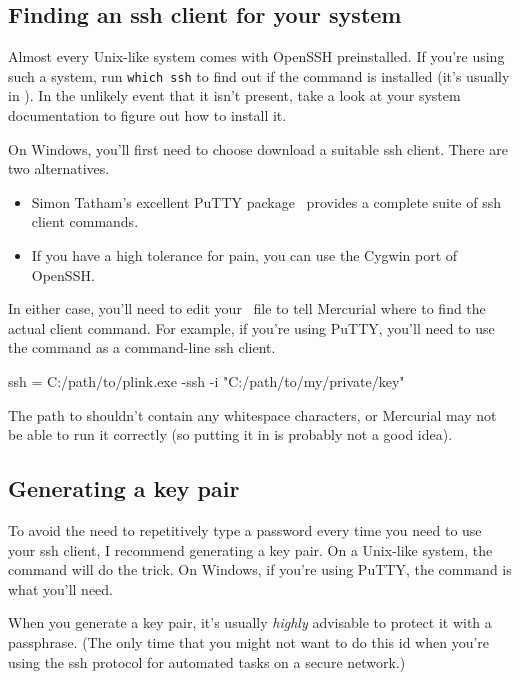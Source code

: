 \subsection{Finding an ssh client for your system}

Almost every Unix-like system comes with OpenSSH preinstalled.  If
you're using such a system, run \Verb|which ssh| to find out if
the  command is installed (it's usually in
).  In the unlikely event that it isn't present,
take a look at your system documentation to figure out how to install
it.

On Windows, you'll first need to choose download a suitable ssh
client.  There are two alternatives.
\begin{itemize}
\item Simon Tatham's excellent PuTTY package~\cite{web:putty} provides
  a complete suite of ssh client commands.
\item If you have a high tolerance for pain, you can use the Cygwin
  port of OpenSSH.
\end{itemize}
In either case, you'll need to edit your \hgini\ file to tell
Mercurial where to find the actual client command.  For example, if
you're using PuTTY, you'll need to use the  command as
a command-line ssh client.
\begin{codesample2}
  [ui]
  ssh = C:/path/to/plink.exe -ssh -i "C:/path/to/my/private/key"
\end{codesample2}

\begin{note}
  The path to  shouldn't contain any whitespace
  characters, or Mercurial may not be able to run it correctly (so
  putting it in  is probably not a good
  idea).
\end{note}

\subsection{Generating a key pair}

To avoid the need to repetitively type a password every time you need
to use your ssh client, I recommend generating a key pair.  On a
Unix-like system, the  command will do the trick.
On Windows, if you're using PuTTY, the  command is
what you'll need.

When you generate a key pair, it's usually \emph{highly} advisable to
protect it with a passphrase.  (The only time that you might not want
to do this id when you're using the ssh protocol for automated tasks
on a secure network.)

